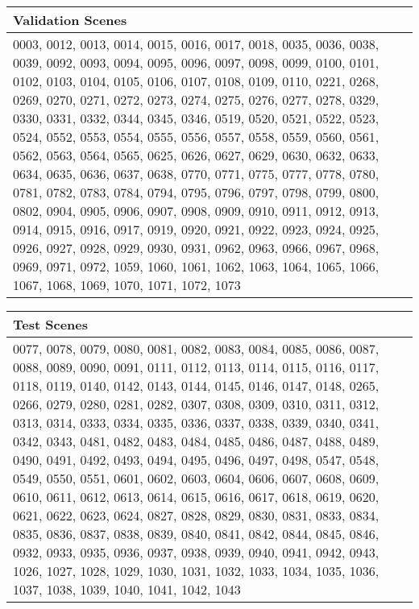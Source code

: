 \begin{center}
	\begin{tabular}{m{14.0cm}}
		Validation Scenes\\
		\hline
		0003, 0012, 0013, 0014, 0015, 0016, 0017, 0018,
		0035, 0036, 0038, 0039, 0092, 0093, 0094, 0095,
		0096, 0097, 0098, 0099, 0100, 0101, 0102, 0103,
		0104, 0105, 0106, 0107, 0108, 0109, 0110, 0221,
		0268, 0269, 0270, 0271, 0272, 0273, 0274, 0275,
		0276, 0277, 0278, 0329, 0330, 0331, 0332, 0344,
		0345, 0346, 0519, 0520, 0521, 0522, 0523, 0524,
		0552, 0553, 0554, 0555, 0556, 0557, 0558, 0559,
		0560, 0561, 0562, 0563, 0564, 0565, 0625, 0626,
		0627, 0629, 0630, 0632, 0633, 0634, 0635, 0636,
		0637, 0638, 0770, 0771, 0775, 0777, 0778, 0780,
		0781, 0782, 0783, 0784, 0794, 0795, 0796, 0797,
		0798, 0799, 0800, 0802, 0904, 0905, 0906, 0907,
		0908, 0909, 0910, 0911, 0912, 0913, 0914, 0915,
		0916, 0917, 0919, 0920, 0921, 0922, 0923, 0924,
		0925, 0926, 0927, 0928, 0929, 0930, 0931, 0962,
		0963, 0966, 0967, 0968, 0969, 0971, 0972, 1059,
		1060, 1061, 1062, 1063, 1064, 1065, 1066, 1067,
		1068, 1069, 1070, 1071, 1072, 1073
	\end{tabular}
\end{center}
\begin{center}
	\begin{tabular}{m{14.0cm}}
		Test Scenes\\
		\hline
		0077, 0078, 0079, 0080, 0081, 0082, 0083, 0084,
		0085, 0086, 0087, 0088, 0089, 0090, 0091, 0111,
		0112, 0113, 0114, 0115, 0116, 0117, 0118, 0119,
		0140, 0142, 0143, 0144, 0145, 0146, 0147, 0148,
		0265, 0266, 0279, 0280, 0281, 0282, 0307, 0308,
		0309, 0310, 0311, 0312, 0313, 0314, 0333, 0334,
		0335, 0336, 0337, 0338, 0339, 0340, 0341, 0342,
		0343, 0481, 0482, 0483, 0484, 0485, 0486, 0487,
		0488, 0489, 0490, 0491, 0492, 0493, 0494, 0495,
		0496, 0497, 0498, 0547, 0548, 0549, 0550, 0551,
		0601, 0602, 0603, 0604, 0606, 0607, 0608, 0609,
		0610, 0611, 0612, 0613, 0614, 0615, 0616, 0617,
		0618, 0619, 0620, 0621, 0622, 0623, 0624, 0827,
		0828, 0829, 0830, 0831, 0833, 0834, 0835, 0836,
		0837, 0838, 0839, 0840, 0841, 0842, 0844, 0845,
		0846, 0932, 0933, 0935, 0936, 0937, 0938, 0939,
		0940, 0941, 0942, 0943, 1026, 1027, 1028, 1029,
		1030, 1031, 1032, 1033, 1034, 1035, 1036, 1037,
		1038, 1039, 1040, 1041, 1042, 1043
	\end{tabular}
\end{center} 

